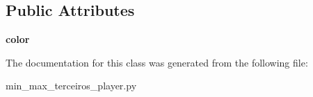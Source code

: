 \subsection*{Public Attributes}
\begin{DoxyCompactItemize}
\item 
\hypertarget{class_tabuleiro_othello-fork_1_1models_1_1players_1_1min__max__terceiros__player_1_1_min_max_player_af0d12d0d792f598aacbca8013517ed09}{}{\bfseries color}\label{class_tabuleiro_othello-fork_1_1models_1_1players_1_1min__max__terceiros__player_1_1_min_max_player_af0d12d0d792f598aacbca8013517ed09}

\end{DoxyCompactItemize}


The documentation for this class was generated from the following file\+:\begin{DoxyCompactItemize}
\item 
min\+\_\+max\+\_\+terceiros\+\_\+player.\+py\end{DoxyCompactItemize}
